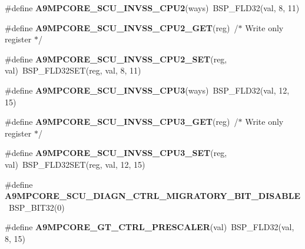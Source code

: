 \begin{DoxyCompactItemize}
\mbox{\label{arm-a9mpcore-regs_8h_a4e9ada488298500e0da82c59155b7ffa}} 
\#define {\bfseries A9\+M\+P\+C\+O\+R\+E\+\_\+\+S\+C\+U\+\_\+\+I\+N\+V\+S\+S\+\_\+\+C\+P\+U2}(ways)~B\+S\+P\+\_\+\+F\+L\+D32(val, 8, 11)
\item 
\mbox{\label{arm-a9mpcore-regs_8h_a3cf0fc4ae344e04f79dee8131e4de0b9}} 
\#define {\bfseries A9\+M\+P\+C\+O\+R\+E\+\_\+\+S\+C\+U\+\_\+\+I\+N\+V\+S\+S\+\_\+\+C\+P\+U2\+\_\+\+G\+ET}(reg)~/$\ast$ Write only register $\ast$/
\item 
\mbox{\label{arm-a9mpcore-regs_8h_aff33040bb44b004d4376ddd5f4123988}} 
\#define {\bfseries A9\+M\+P\+C\+O\+R\+E\+\_\+\+S\+C\+U\+\_\+\+I\+N\+V\+S\+S\+\_\+\+C\+P\+U2\+\_\+\+S\+ET}(reg,  val)~B\+S\+P\+\_\+\+F\+L\+D32\+S\+ET(reg, val, 8, 11)
\item 
\mbox{\label{arm-a9mpcore-regs_8h_a9b28d58714da5d119f55dedc65733901}} 
\#define {\bfseries A9\+M\+P\+C\+O\+R\+E\+\_\+\+S\+C\+U\+\_\+\+I\+N\+V\+S\+S\+\_\+\+C\+P\+U3}(ways)~B\+S\+P\+\_\+\+F\+L\+D32(val, 12, 15)
\item 
\mbox{\label{arm-a9mpcore-regs_8h_a19ebcad9184291e102f09fc5b6f3a0e7}} 
\#define {\bfseries A9\+M\+P\+C\+O\+R\+E\+\_\+\+S\+C\+U\+\_\+\+I\+N\+V\+S\+S\+\_\+\+C\+P\+U3\+\_\+\+G\+ET}(reg)~/$\ast$ Write only register $\ast$/
\item 
\mbox{\label{arm-a9mpcore-regs_8h_ad7913e3468098a925dcccc8581cc2e3d}} 
\#define {\bfseries A9\+M\+P\+C\+O\+R\+E\+\_\+\+S\+C\+U\+\_\+\+I\+N\+V\+S\+S\+\_\+\+C\+P\+U3\+\_\+\+S\+ET}(reg,  val)~B\+S\+P\+\_\+\+F\+L\+D32\+S\+ET(reg, val, 12, 15)
\item 
\mbox{\label{arm-a9mpcore-regs_8h_aac5e821d0e21559233ef23eb5defe8bb}} 
\#define {\bfseries A9\+M\+P\+C\+O\+R\+E\+\_\+\+S\+C\+U\+\_\+\+D\+I\+A\+G\+N\+\_\+\+C\+T\+R\+L\+\_\+\+M\+I\+G\+R\+A\+T\+O\+R\+Y\+\_\+\+B\+I\+T\+\_\+\+D\+I\+S\+A\+B\+LE}~B\+S\+P\+\_\+\+B\+I\+T32(0)
\item 
\mbox{\label{arm-a9mpcore-regs_8h_a33b62da273b99766b550d3a5ae34542e}} 
\#define {\bfseries A9\+M\+P\+C\+O\+R\+E\+\_\+\+G\+T\+\_\+\+C\+T\+R\+L\+\_\+\+P\+R\+E\+S\+C\+A\+L\+ER}(val)~B\+S\+P\+\_\+\+F\+L\+D32(val, 8, 15)

\end{DoxyCompactItemize}
